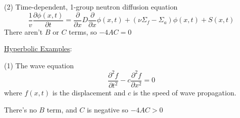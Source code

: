 \documentclass[12pt]{article}
\newcommand{\Macro}{\ensuremath{\Sigma}}
\begin{document}
\vspace*{2em}
(2) Time-dependent, 1-group neutron diffusion equation
%
\begin{equation}
\frac{1}{v} \frac{\partial \phi(x,t)}{\partial t} = \frac{\partial}{\partial x} D \frac{\partial}{\partial x} \phi(x,t) + (\nu \Macro_f - \Macro_a) \phi(x,t) + S(x,t) \nonumber
\end{equation}
%
There aren't $B$ or $C$ terms, so $-4AC = 0$

\vspace*{1em}
\noindent \underline{Hyperbolic Examples}:

(1) The wave equation
%
\begin{equation}
\frac{\partial^2 f}{\partial t^2} - c \frac{\partial^2 f}{\partial x^2} = 0
\end{equation}
%
where $f(x,t)$ is the displacement and $c$ is the speed of wave propagation.

\noindent There's no $B$ term, and $C$ is negative so $-4AC > 0$

%
%

\end{document}
